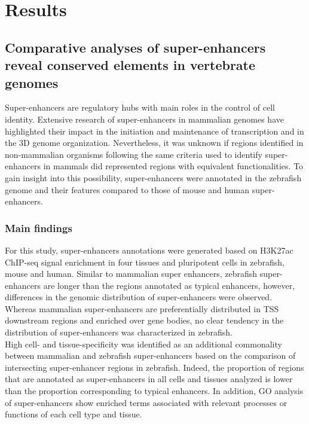 \chapter{Results}

	\section{Comparative analyses of super-enhancers reveal conserved elements in vertebrate genomes}

		Super-enhancers are regulatory hubs with main roles in the control of cell identity. Extensive research of super-enhancers in mammalian genomes have highlighted their impact in the initiation and maintenance of transcription and in the 3D genome organization. Nevertheless, it was unknown if regions identified in non-mammalian organisms following the same criteria used to identify super-enhancers in mammals did represented regions with equivalent functionalities. To gain insight into this possibility, super-enhancers were annotated in the zebrafish genome and their features compared to those of mouse and human super-enhancers.\\

		\subsection{Main findings}

			For this study, super-enhancers annotations were generated based on H3K27ac ChIP-seq signal enrichment in four tissues and pluripotent cells in zebrafish, mouse and human. Similar to mammalian super enhancers, zebrafish super-enhancers are longer than the regions annotated as typical enhancers, however, differences in the genomic distribution of super-enhancers were observed. Whereas mammalian super-enhancers are preferentially distributed in TSS downstream regions and enriched over gene bodies, no clear tendency in the distribution of super-enhancers was characterized in zebrafish.\\

			High cell- and tissue-specificity was identified as an additional commonality between mammalian and zebrafish super-enhancers based on the comparison of intersecting super-enhancer regions in zebrafish. Indeed, the proportion of regions that are annotated as super-enhancers in all cells and tissues analyzed is lower than the proportion corresponding to typical enhancers. In addition, GO analysis of super-enhancers show enriched terms associated with relevant processes or functions of each cell type and tissue.\\

